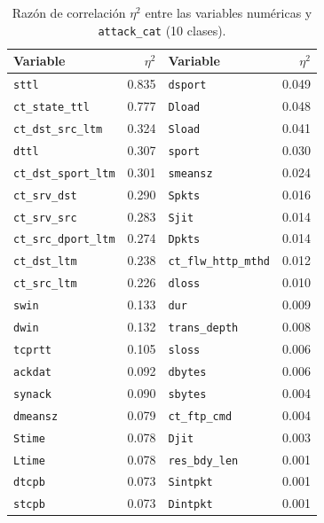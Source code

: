 \documentclass[conference]{IEEEtran}
\begin{document}
\begin{table}[h!]
\centering
\caption{Razón de correlación $\eta^2$ entre las variables numéricas y \texttt{attack\_cat} (10 clases).}
\label{tab:eta}
\footnotesize
\begin{tabular}{lrlr}
\hline
\textbf{Variable} & \textbf{$\eta^2$} & \textbf{Variable} & \textbf{$\eta^2$} \\
\hline
\texttt{sttl}                & 0.835 & \texttt{dsport}              & 0.049 \\
\texttt{ct\_state\_ttl}      & 0.777 & \texttt{Dload}               & 0.048 \\
\texttt{ct\_dst\_src\_ltm}   & 0.324 & \texttt{Sload}               & 0.041 \\
\texttt{dttl}                & 0.307 & \texttt{sport}               & 0.030 \\
\texttt{ct\_dst\_sport\_ltm} & 0.301 & \texttt{smeansz}             & 0.024 \\
\texttt{ct\_srv\_dst}        & 0.290 & \texttt{Spkts}               & 0.016 \\
\texttt{ct\_srv\_src}        & 0.283 & \texttt{Sjit}                & 0.014 \\
\texttt{ct\_src\_dport\_ltm} & 0.274 & \texttt{Dpkts}               & 0.014 \\
\texttt{ct\_dst\_ltm}        & 0.238 & \texttt{ct\_flw\_http\_mthd} & 0.012 \\
\texttt{ct\_src\_ltm}        & 0.226 & \texttt{dloss}               & 0.010 \\
\texttt{swin}                & 0.133 & \texttt{dur}                 & 0.009 \\
\texttt{dwin}                & 0.132 & \texttt{trans\_depth}        & 0.008 \\
\texttt{tcprtt}              & 0.105 & \texttt{sloss}               & 0.006 \\
\texttt{ackdat}              & 0.092 & \texttt{dbytes}              & 0.006 \\
\texttt{synack}              & 0.090 & \texttt{sbytes}              & 0.004 \\
\texttt{dmeansz}             & 0.079 & \texttt{ct\_ftp\_cmd}        & 0.004 \\
\texttt{Stime}               & 0.078 & \texttt{Djit}                & 0.003 \\
\texttt{Ltime}               & 0.078 & \texttt{res\_bdy\_len}       & 0.001 \\
\texttt{dtcpb}               & 0.073 & \texttt{Sintpkt}             & 0.001 \\
\texttt{stcpb}               & 0.073 & \texttt{Dintpkt}             & 0.001 \\
\hline
\end{tabular}
\end{table}
\end{document}
